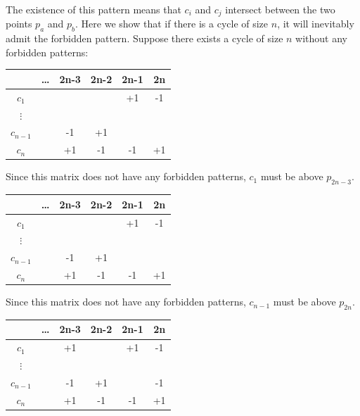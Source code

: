 \documentclass{NSF}
\begin{document}
The existence of this pattern means that $c_i$ and $c_j$ intersect between the two points $p_a$ and $p_b$. Here we show that if there is a cycle of size $n$, it will inevitably admit the forbidden pattern. Suppose there exists a cycle of size $n$ without any forbidden patterns:

\begin{center}
\begin{tabular}{c|c c c c c }
                 & \dots& 2n-3  & 2n-2  & 2n-1  & 2n \\ \hline
$c_1$              &      &       &       &  +1   &  -1   \\
$\vdots$           &      &       &       &       &    \\
$c_{n-1}$          &      &  -1   &   +1  &       &    \\
$c_{n}$            &      &  +1   &   -1  &  -1   &  +1 \\
\end{tabular}
\end{center}

Since this matrix does not have any forbidden patterns, $c_1$ must be above $p_{2n-3}$.
\begin{center}

\begin{tabular}{c|c c c c c }
            & \dots & 2n-3  & 2n-2  & 2n-1  & 2n \\ \hline
$c_1$         &       & \cellcolor[HTML]{FFFFC7}{\color{blue}+1}  &    & \cellcolor[HTML]{FFFFC7} +1   & -1    \\
$\vdots$      &       &       &       &       &    \\
$c_{n-1}$     &       &  -1   &  +1   &       &    \\
$c_{n}$       &       & \cellcolor[HTML]{FFFFC7} +1               & -1 & \cellcolor[HTML]{FFFFC7}  -1  &  +1 \\
\end{tabular}
\end{center}

Since this matrix does not have any forbidden patterns, $c_{n-1}$ must be above $p_{2n}$.

\begin{center}
\begin{tabular}{c|c c c c c }
                    & \dots & 2n-3 & 2n-2 & 2n-1 & 2n \\ \hline
$c_1$                 &       &\cellcolor[HTML]{FFFFC7} +1       &          &  +1    &\cellcolor[HTML]{FFFFC7} -1    \\
$\vdots$          &            &         &          &          &    \\
$c_{n-1}$   &            &  \cellcolor[HTML]{FFFFC7}-1    &  +1    &          &  \cellcolor[HTML]{FFFFC7} {\color{blue}-1} \\
$c_{n}$      &             &  +1   &   -1  &  -1    &  +1 \\
\end{tabular}
\end{center}
\end{document}
